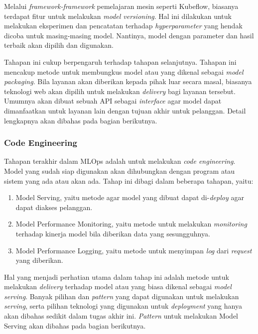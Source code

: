 Melalui \textit{framework-framework} pemelajaran mesin seperti Kubeflow, biasanya terdapat fitur untuk melakukan \textit{model versioning}.
Hal ini dilakukan untuk melakukan eksperimen dan pencatatan terhadap \textit{hyperparameter} yang hendak dicoba untuk masing-masing model.
Nantinya, model dengan parameter dan hasil terbaik akan dipilih dan digunakan.

Tahapan ini cukup berpengaruh terhadap tahapan selanjutnya.
Tahapan ini mencakup metode untuk membungkus model atau yang dikenal sebagai \textit{model packaging}.
Bila layanan akan diberikan kepada pihak luar secara masal, biasanya teknologi web akan dipilih untuk melakukan \textit{delivery} bagi layanan tersebut.
Umumnya akan dibuat sebuah API sebagai \textit{interface} agar model dapat dimanfaatkan untuk layanan lain dengan tujuan akhir untuk pelanggan. Detail lengkapnya akan dibahas pada bagian berikutnya. 

\subsubsection{Code Engineering}

Tahapan terakhir dalam MLOps adalah untuk melakukan \textit{code engineering}.
Model yang sudah siap digunakan akan dihubungkan dengan program atau sistem yang ada atau akan ada.
Tahap ini dibagi dalam beberapa tahapan, yaitu:

\begin{enumerate}
  \item Model Serving, yaitu metode agar model yang dibuat dapat di-\textit{deploy} agar dapat diakses pelanggan.
  \item Model Performance Monitoring, yaitu metode untuk melakukan \textit{monitoring} terhadap kinerja model bila diberikan data yang sesungguhnya.
  \item Model Performance Logging, yaitu metode untuk menyimpan \textit{log} dari \textit{request} yang diberikan.
\end{enumerate}

Hal yang menjadi perhatian utama dalam tahap ini adalah metode untuk melakukan \textit{delivery} terhadap model atau yang biasa dikenal sebagai \textit{model serving}.
Banyak pilihan dan \textit{pattern} yang dapat digunakan untuk melakukan \textit{serving}, serta pilihan teknologi yang digunakan untuk \textit{deployment} yang hanya akan dibahas sedikit dalam tugas akhir ini.
\textit{Pattern} untuk melakukan Model Serving akan dibahas pada bagian berikutnya.